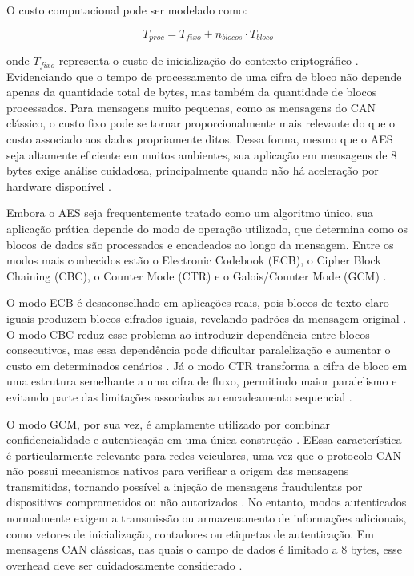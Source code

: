 O custo computacional pode ser modelado como:

\begin{equation}
T_{proc} = T_{fixo} + n_{blocos} \cdot T_{bloco}
\end{equation}

\noindent onde $T_{fixo}$ representa o custo de inicialização do contexto criptográfico \cite{tanenbaum2016structured}. Evidenciando que o tempo de processamento de uma cifra de bloco não depende apenas da quantidade total de bytes, mas também da quantidade de blocos processados. Para mensagens muito pequenas, como as mensagens do CAN clássico, o custo fixo pode se tornar proporcionalmente mais relevante do que o custo associado aos dados propriamente ditos. Dessa forma, mesmo que o AES seja altamente eficiente em muitos ambientes, sua aplicação em mensagens de 8 bytes exige análise cuidadosa, principalmente quando não há aceleração por hardware disponível \cite{dhanda2025aes}.

Embora o AES seja frequentemente tratado como um algoritmo único, sua aplicação prática depende do modo de operação utilizado, que determina como os blocos de dados são processados e encadeados ao longo da mensagem. Entre os modos mais conhecidos estão o Electronic Codebook (ECB), o Cipher Block Chaining (CBC), o Counter Mode (CTR) e o Galois/Counter Mode (GCM) \cite{dworkin2001recommendation}.

O modo ECB é desaconselhado em aplicações reais, pois blocos de texto claro iguais produzem blocos cifrados iguais, revelando padrões da mensagem original \cite{bellare2005introduction}. O modo CBC reduz esse problema ao introduzir dependência entre blocos consecutivos, mas essa dependência pode dificultar paralelização e aumentar o custo em determinados cenários \cite{ferguson2011cryptography}. Já o modo CTR transforma a cifra de bloco em uma estrutura semelhante a uma cifra de fluxo, permitindo maior paralelismo e evitando parte das limitações associadas ao encadeamento sequencial \cite{lipmaa2000ctr}.

O modo GCM, por sua vez, é amplamente utilizado por combinar confidencialidade e autenticação em uma única construção \cite{mcgrew2004galois}. EEssa característica é particularmente relevante para redes veiculares, uma vez que o protocolo CAN não possui mecanismos nativos para verificar a origem das mensagens transmitidas, tornando possível a injeção de mensagens fraudulentas por dispositivos comprometidos ou não autorizados \cite{lotto2024survey}. No entanto, modos autenticados normalmente exigem a transmissão ou armazenamento de informações adicionais, como vetores de inicialização, contadores ou etiquetas de autenticação. Em mensagens CAN clássicas, nas quais o campo de dados é limitado a 8 bytes, esse overhead deve ser cuidadosamente considerado \cite{de2023security}.

